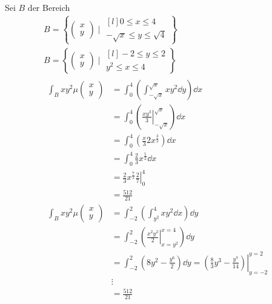 \begin{bsp}
	Sei $B$ der Bereich
	\begin{gather*}
		B = \left\{ \begin{pmatrix} x \\ y \end{pmatrix} \mid \begin{matrix*}[l] 0 \leq x \leq 4 \\ -\sqrt{x} \leq y \leq \sqrt{4} \end{matrix*} \right\} \\
		B = \left\{ \begin{pmatrix} x \\ y \end{pmatrix} \mid \begin{matrix*}[l] -2 \leq y \leq 2 \\ y^2 \leq x \leq 4 \end{matrix*} \right\} \\
		\begin{split}
			\int_B xy^2 \mu\begin{pmatrix} x \\ y \end{pmatrix}
				&= \int_0^4 \left( \int_{-\sqrt{x}}^{\sqrt{x}} xy^2 \dd y \right) \dd x \\
				&= \int_0^4 \left( \left. \frac{xy^3}{3} \right|_{-\sqrt{x}}^{\sqrt{x}} \right) \dd x \\
				&= \int_0^4 \left( \frac{x}{3} 2x^{\frac{3}{2}} \right) \dd x \\
				&= \int_0^4 \frac{2}{3} x^{\frac{5}{2}} \dd x \\
				&= \left. \frac{2}{3} x^{\frac{7}{2}} \frac{2}{7} \right|_0^4 \\
				&= \frac{512}{21} \\
			\int_B xy^2 \mu\begin{pmatrix} x \\ y \end{pmatrix}
				&= \int_{-2}^2 \left( \int_{y^2}^4 xy^2 \dd x \right) \dd y \\
				&= \int_{-2}^2 \left( \left. \frac{x^2y^2}{2} \right|_{x=y^2}^{x=4} \right) \dd y \\
				&= \int_{-2}^2 \left( 8y^2 - \frac{y^6}{2} \right) \dd y = \left. \left( \frac{8}{3} y^3 - \frac{y^7}{14} \right) \right|_{y=-2}^{y=2} \\
				&\vdots \\
				&= \frac{512}{21}
		\end{split}
	\end{gather*}
\end{bsp}
